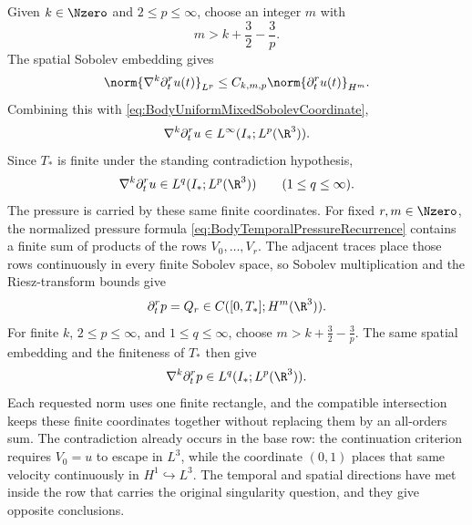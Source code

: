 Given \(k\in\Nzero\) and \(2\leq p\leq\infty\), choose an integer \(m\) with
\begin{equation}\label{eq:SobolevProjectionThreshold}
  m>k+\frac32-\frac3p.
\end{equation}
The spatial Sobolev embedding \parencite[Theorem~7.28]{Cerda2010} gives
\begin{equation}\label{eq:MasterSpatialProjection}
  \norm{\nabla^k\partial_t^ru(t)}_{L^p}
  \leq C_{k,m,p}\norm{\partial_t^ru(t)}_{H^m}.
\end{equation}
Combining this with \eqref{eq:BodyUniformMixedSobolevCoordinate},
\begin{equation}\label{eq:MasterUniformMixedEstimate}
  \nabla^k\partial_t^ru
  \in L^\infty(I_*;L^p(\R^3)).
\end{equation}
Since \(T_*\) is finite under the standing contradiction hypothesis,
\begin{equation}\label{eq:MasterFiniteTimeMixedEstimate}
  \nabla^k\partial_t^ru
  \in L^q(I_*;L^p(\R^3))
  \qquad(1\leq q\leq\infty).
\end{equation}
The pressure is carried by these same finite coordinates.
For fixed \(r,m\in\Nzero\), the normalized pressure formula \eqref{eq:BodyTemporalPressureRecurrence} contains a finite sum of products of the rows \(V_0,\ldots,V_r\).
The adjacent traces place those rows continuously in every finite Sobolev space, so Sobolev multiplication and the Riesz-transform bounds give
\begin{equation}\label{eq:MasterPressureSobolevCoordinate}
  \partial_t^rp=Q_r
  \in C([0,T_*];H^m(\R^3)).
\end{equation}
For finite \(k\), \(2\leq p\leq\infty\), and \(1\leq q\leq\infty\), choose \(m>k+\tfrac32-\tfrac3p\).
The same spatial embedding \parencite[Theorem~7.28]{Cerda2010} and the finiteness of \(T_*\) then give
\begin{equation}\label{eq:MasterFiniteTimePressureEstimate}
  \nabla^k\partial_t^rp
  \in L^q(I_*;L^p(\R^3)).
\end{equation}
Each requested norm uses one finite rectangle, and the compatible intersection keeps
these finite coordinates together without replacing them by an all-orders sum.
The contradiction already occurs in the base row: the continuation criterion requires
\(V_0=u\) to escape in \(L^3\), while the coordinate \((0,1)\) places that same
velocity continuously in \(H^1\hookrightarrow L^3\).
The temporal and spatial directions have met inside the row that carries the original
singularity question, and they give opposite conclusions.

